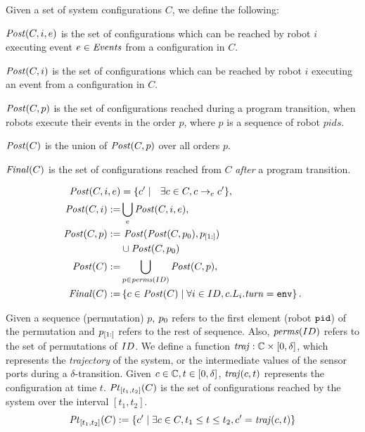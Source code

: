  Given a set of system configurations $C$, we define the following:
 \begin{inparaenum}[(i)]
     \item $\mathit{Post}(C,i,e)$ is the set of configurations which can be reached by robot $i$ executing event $e \in \mathit{Events}$ from a configuration in $C$.
     \item$\mathit{Post}(C,i)$ is the set of configurations which can be reached by robot $i$ executing an event from a configuration in $C$.
     \item$\mathit{Post}(C,p)$ is the set of configurations reached during a program transition, when robots execute their events in the order $p$, where $p$ is a sequence of robot $\mathit{pids}$.
     \item $\mathit{Post}(C)$ is the union of $\mathit{Post}(C,p)$ over all orders $p$.
     \item$\mathit{Final}(C)$ is the set of configurations reached from $C$ \emph{after} a program transition.
 \end{inparaenum}
\vspace{1mm}
\begin{mdframed}
\footnotesize
\begin{align*}
    \mathit{Post} (C,i,e) &= \{ c^\prime\mid \ \ \exists c \in C, c \rightarrow_{e} c^\prime \},\\
\mathit{Post}(C,i) :=& \bigcup_e \mathit{Post}(C,i,e),\\
\mathit{Post}(C,p) := & \ \mathit{Post}(\mathit{Post}(C,p_0), p_{[1:]})\\ & \cup \mathit{Post}(C,p_0)\\
\mathit{Post}(C) :=& \bigcup_{p\in \mathit{perms}(ID)} \mathit{Post}(C,p), \\
\mathit{Final}(C) :=& \left\{ c\in \mathit{Post}(C)\mid \forall i \in ID, c.L_i.\mathit{turn} = \mathtt{env} \right\}.
\end{align*}
\end{mdframed}

Given a sequence (permutation) $p$, $p_0$ refers to the first element (robot $\texttt{pid}$) of the permutation and $p_{[1:]}$ refers to the rest of sequence. Also, $\mathit{perms}(ID)$ refers to the set of permutations of $ID$.
We define a function $\mathit{traj}: \mathbb{C} \times \left[0,\delta\right]$, which represents the \emph{trajectory} of the system, or the intermediate values of the sensor ports during a $\delta$-transition. Given $c\in \mathbb{C}, t\in \left[0,\delta\right]$, $\mathit{traj}(c,t)$ represents the configuration at time $t$. $\mathit{Pt}_{[t_1,t_2]}(C)$ is the set of configurations reached by the system over the interval $[t_1,t_2]$.
$$\mathit{Pt}_{[t_1,t_2]}(C) := \left\{c^\prime \mid \exists c\in C, t_1 \leq t\leq t_2 , c^\prime = \mathit{traj}(c,t)\right\}$$

